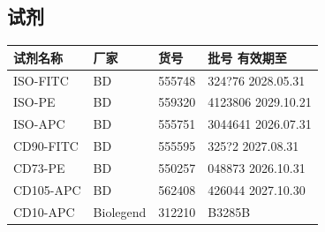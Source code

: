\documentclass[UTF8,10pt,a4paper,fontset=fandol]{ctexart}
\newcommand{\fieldvalue}[1]{#1}
\newcommand{\handwritten}[1]{#1}
\begin{document}
\subsection{试剂}

\begin{center}
\small
\begin{tabularx}{\textwidth}{|p{}|p{}|X|X|}
\hline
试剂名称 & 厂家 & 货号 & 批号 \quad\quad 有效期至 \\ \hline
ISO-FITC & BD & 555748 &
\fieldvalue{\handwritten{324?76}}\quad
\fieldvalue{\handwritten{2028.05.31}} \\ \hline
ISO-PE & BD & 559320 &
\fieldvalue{\handwritten{4123806}}\quad
\fieldvalue{\handwritten{2029.10.21}} \\ \hline
ISO-APC & BD & 555751 &
\fieldvalue{\handwritten{3044641}}\quad
\fieldvalue{\handwritten{2026.07.31}} \\ \hline
CD90-FITC & BD & 555595 &
\fieldvalue{\handwritten{325?2}}\quad
\fieldvalue{\handwritten{2027.08.31}} \\ \hline
CD73-PE & BD & 550257 &
\fieldvalue{\handwritten{048873}}\quad
\fieldvalue{\handwritten{2026.10.31}} \\ \hline
CD105-APC & BD & 562408 &
\fieldvalue{\handwritten{426044}}\quad
\fieldvalue{\handwritten{2027.10.30}} \\ \hline
CD10-APC & Biolegend & 312210 &
\fieldvalue{\handwritten{B3285B}}\quad

\end{tabularx}
\end{center}
\end{document}
